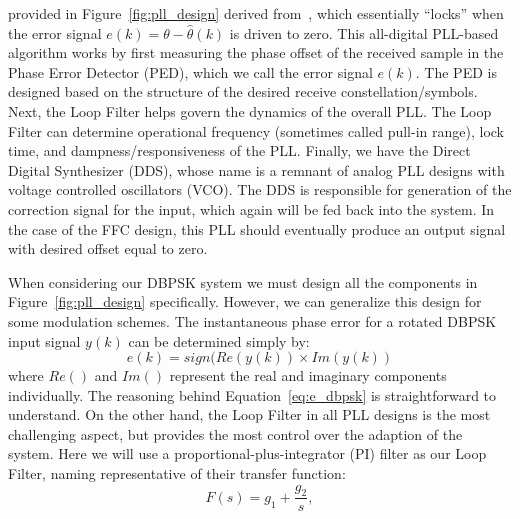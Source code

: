 \documentclass[letterpaper,12pt]{article}
\begin{document}
provided in Figure~\ref{fig:pll_design} derived from~\cite[Chapter~7]{rice2009}, which essentially ``locks'' 
when the error signal $e(k)=\theta-\hat{\theta}(k)$ is driven to zero. This all-digital PLL-based algorithm 
works by first measuring the phase offset of the received sample in the Phase Error Detector (PED), which we 
call the error signal $e(k)$.  The PED is designed based on the structure of the desired receive 
constellation/symbols.  Next, the Loop Filter helps govern the dynamics of the overall PLL.  The Loop Filter 
can determine operational frequency (sometimes called pull-in range), lock time, and dampness/responsiveness 
of the PLL.  Finally, we have the Direct Digital Synthesizer (DDS), whose name is a remnant of analog PLL 
designs with voltage controlled oscillators (VCO).  The DDS is responsible for generation of the correction 
signal for the input, which again will be fed back into the system. In the case of the FFC design, this 
PLL should eventually produce an output signal with desired offset equal to zero.\par
%
When considering our DBPSK system we must design all the components in Figure~\ref{fig:pll_design} 
specifically.  However, we can generalize this design for some modulation schemes.  The instantaneous phase 
error for a rotated DBPSK input signal $y(k)$ can be determined simply by:
%
\begin{equation}\label{eq:e_dbpsk}
 e(k) = sign(Re(y(k))\times Im(y(k))
\end{equation}
%
where $Re()$ and $Im()$ represent the real and imaginary components individually. The reasoning behind 
Equation~\eqref{eq:e_dbpsk} is straightforward to understand.  On the other hand, the Loop Filter in all PLL 
designs is the most challenging aspect, but provides the most control over the adaption of the system.  Here 
we will use a proportional-plus-integrator (PI) filter as our Loop Filter, naming representative of their 
transfer function:
%
\begin{equation}\label{eq:s_xfer}
 F(s) = g_1 + \frac{g_2}{s},
\end{equation}
%
%
\end{document}
